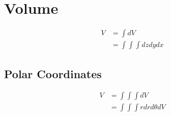 \section{Volume}

  \begin{align}
    V &= \int dV \\
    &= \int \int \int dz dy dx
  \end{align}

  \subsection{Polar Coordinates}

    \begin{align}
      V &= \int \int \int dV \\
      &= \int \int \int r dr d\theta dV
    \end{align}